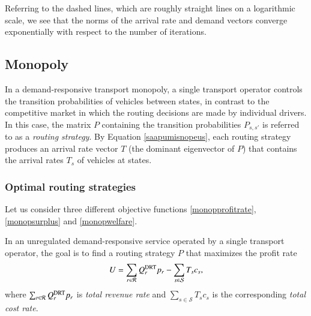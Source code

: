 \documentclass[dissertation,draft*]{aaltoseries}
\begin{document}
Referring to the dashed lines, which are roughly straight lines on a logarithmic scale, 
we see that the norms of the arrival rate and demand vectors converge exponentially
with respect to the number of iterations. 





\subsection{Monopoly}
\label{monopdescription}
In a demand-responsive transport monopoly, a single transport operator controls the transition probabilities of vehicles
between states, in contrast to the competitive market in which the routing decisions are made by individual drivers.
In this case, the matrix $P$ containing the transition probabilities $P_{s,s'}$ is referred to as a \emph{routing strategy}.
By Equation \eqref{saapumisnopeus},
each routing strategy produces an arrival rate vector $T$ (the dominant eigenvector of $P$) that contains the arrival rates $T_s$ of
vehicles at states.

\subsubsection{Optimal routing strategies}
Let us consider three different objective functions \eqref{monopprofitrate}, \eqref{monopsurplus} and \eqref{monopwelfare}.

In an unregulated demand-responsive service operated by a single transport operator, 
the goal is to find a routing strategy $P$ that maximizes the profit rate
\begin{align}
\label{monopprofitrate}
U = \sum_{r \in \mathcal{R}}  Q_r^{\rm DRT} p_r - \sum_{s \in \mathcal{S}} T_s c_{s},
\end{align}
where $\sum_{r \in \mathcal{R}}  Q_r^{\rm DRT} p_r$ is \emph{total revenue rate} 
and $\sum_{s \in \mathcal{S}} T_s c_{s}$ is
the corresponding \emph{total cost rate}. 
\end{document}
